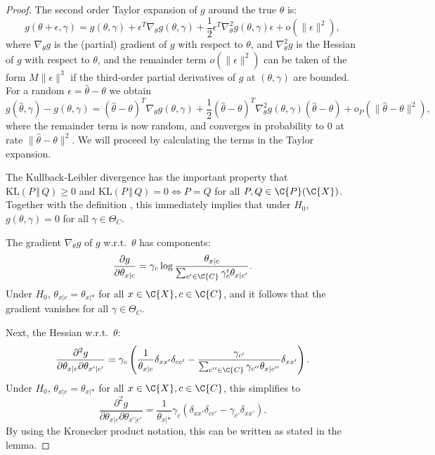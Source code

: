 \begin{proof}
The second order Taylor expansion of $g$ around the true $\theta$ is:
$$g(\theta + \epsilon, \gamma) = g(\theta,\gamma) + \epsilon^T \nabla_\theta g(\theta,\gamma) + \frac{1}{2} \epsilon^T \nabla^2_\theta g(\theta,\gamma) \epsilon + o(\lVert\epsilon\rVert^2),$$
where $\nabla_\theta g$ is the (partial) gradient of $g$ with respect to $\theta$, and
$\nabla_\theta^2 g$ is the Hessian of $g$ with respect to $\theta$, and the remainder
term $o(\lVert\epsilon\rVert^2)$ can be taken of the form $M \lVert\epsilon\rVert^3$ if the 
third-order partial derivatives of $g$ at $(\theta,\gamma)$ are bounded.
For a random $\epsilon = \hat\theta - \theta$ we obtain
  \begin{equation}
    g(\hat\theta, \gamma) - g(\theta,\gamma) = (\hat\theta - \theta)^T \nabla_\theta g(\theta,\gamma) + \frac{1}{2} (\hat\theta - \theta)^T \nabla^2_\theta g(\theta,\gamma) (\hat\theta - \theta) + o_P(\lVert\hat\theta - \theta\rVert^2),
  \end{equation}
where the remainder term is now random, and converges 
in probability to 0 at rate $\lVert\hat\theta - \theta\rVert^2$.
We will proceed by calculating the terms in the Taylor expansion.

The Kullback-Leibler divergence has the important property that $\mathrm{KL}(P \,\Vert\, Q) \ge 0$ and $\mathrm{KL}(P \,\Vert\, Q) = 0 \iff P = Q$ for all $P,Q \in \C{P}(\C{X})$. 
Together with the definition , 
this immediately implies that under $H_0$, $g(\theta,\gamma) = 0$ for all $\gamma \in \Theta_C$.

The gradient $\nabla_\theta g$ of $g$ w.r.t.\ $\theta$ has components:
  $$\frac{\partial g}{\partial \theta_{x|c}} 
  = \gamma_c \log \frac{\theta_{x|c}}{\sum_{c'\in\C{C}} \gamma_c' \theta_{x|c'}}.$$
Under $H_0$, $\theta_{x|c} = \theta_{x|\ast}$ for all $x\in\C{X},c\in\C{C}$, and it follows that
the gradient vanishes for all $\gamma\in\Theta_C$.

Next, the Hessian w.r.t.\ $\theta$:
  $$\frac{\partial^2 g}{\partial \theta_{x|c} \partial \theta_{x'|c'}} = 
  \gamma_c \left( \frac{1}{\theta_{x|c}} \delta_{xx'} \delta_{cc'} - \frac{\gamma_{c'}}{\sum_{c''\in\C{C}} \gamma_{c''} \theta_{x|c''}} \delta_{xx'} \right).
  $$
Under $H_0$, $\theta_{x|c} = \theta_{x|\ast}$ for all $x\in\C{X},c\in\C{C}$, this simplifies to
  $$\frac{\partial^2 g}{\partial \theta_{x|c} \partial \theta_{x'|c'}} = 
  \frac{1}{\theta_{x|\ast}} \gamma_c \left( \delta_{xx'} \delta_{cc'} - \gamma_{c'} \delta_{xx'} \right).
  $$
By using the Kronecker product notation, this can be written as stated in the lemma.


\end{proof}

